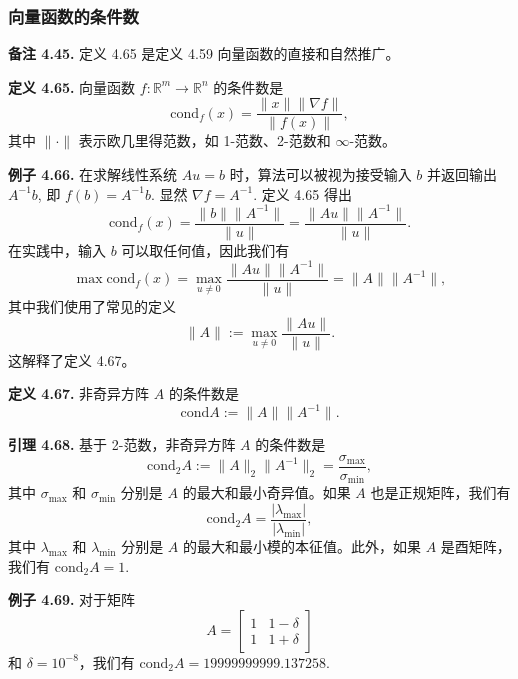 \documentclass[a4paper]{ctexart}
\begin{document}
{%


\subsubsection{向量函数的条件数}

\noindent \textbf{备注 4.45.} 定义 4.65 是定义 4.59 向量函数的直接和自然推广。

\noindent \textbf{定义 4.65.} 向量函数 $f : \mathbb{R}^m \rightarrow \mathbb{R}^n$ 的条件数是
\[
  \text{cond}_f(x) = \frac{\|x\| \|\nabla f\|}{\|f(x)\|}, \tag{4.33}
\]
其中 $\|\cdot\|$ 表示欧几里得范数，如 1-范数、2-范数和 $\infty$-范数。

\noindent \textbf{例子 4.66.} 在求解线性系统 $Au = b$ 时，算法可以被视为接受输入 $b$ 并返回输出 $A^{-1}b$, 
即 $f(b) = A^{-1}b$. 显然 $\nabla f = A^{-1}$. 定义 4.65 得出
\[
  \text{cond}_f(x) = \frac{\|b\| \|A^{-1}\|}{\|u\|} = \frac{\|Au\| \|A^{-1}\|}{\|u\|}.
\]
在实践中，输入 $b$ 可以取任何值，因此我们有
\[
  \max \text{cond}_f(x) = \max_{u \neq 0} \frac{\|Au\| \|A^{-1}\|}{\|u\|} = \|A\| \|A^{-1}\|,
\]
其中我们使用了常见的定义
\[
  \|A\| := \max_{u \neq 0} \frac{\|Au\|}{\|u\|}. \tag{4.34}
\]
这解释了定义 4.67。

\noindent \textbf{定义 4.67.} 非奇异方阵 $A$ 的条件数是
\[
\text{cond} A := \|A\| \|A^{-1}\|. \tag{4.35}
\]

\noindent \textbf{引理 4.68.} 基于 2-范数，非奇异方阵 $A$ 的条件数是
\[
\text{cond}_2 A := \|A\|_2 \|A^{-1}\|_2 = \frac{\sigma_{\text{max}}}{\sigma_{\text{min}}},
\]
其中 $\sigma_{\text{max}}$ 和 $\sigma_{\text{min}}$ 分别是 $A$ 的最大和最小奇异值。如果 $A$ 也是正规矩阵，我们有
\[
\text{cond}_2 A = \frac{|\lambda_{\text{max}}|}{|\lambda_{\text{min}}|},
\]
其中 $\lambda_{\text{max}}$ 和 $\lambda_{\text{min}}$ 分别是 $A$ 的最大和最小模的本征值。此外，如果 $A$ 是酉矩阵，我们有 $\text{cond}_2 A = 1$.

\noindent \textbf{例子 4.69.} 对于矩阵
\[
A = \begin{bmatrix}
1 & 1 - \delta \\
1 & 1 + \delta
\end{bmatrix}
\]
和 $\delta = 10^{-8}$，我们有 $\text{cond}_2 A = 19999999999.137258$.

}
\end{document}
